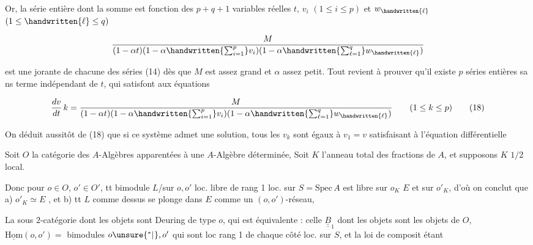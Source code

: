 Or, la série entière dont la somme est fonction des $p+q+1$ variables réelles $t$, $v_i$ $(1\leq i\leq p)$ et $w_{\handwritten{\ell}}$ $(1\leq\handwritten{\ell}\leq q)$

\[
\frac{M}{(1-\alpha t)(1-\alpha\handwritten{\sum_{i=1}^{p}}v_i)(1-\alpha\handwritten{\sum_{\ell=1}^{q}}w_{\handwritten{\ell}})}
\]

est une jorante de chacune des séries (14) dès que $M$ est assez grand et $\alpha$ assez petit. Tout revient à prouver qu'il existe $p$ séries entières sa ns terme indépendant de $t$, qui satisfont aux équations

\[
\frac{dv}{dt}\,k=\frac{M}{(1-\alpha t)(1-\alpha\handwritten{\sum_{i=1}^{p}}v_i)(1-\alpha\handwritten{\sum_{\ell=1}^{q}}w_{\handwritten{\ell}})}
\qquad(1\leq k\leq p)\tag*{(18)}
\]

On déduit aussitôt de (18) que si ce système admet une solution, tous les $v_k$ sont égaux à $v_1=v$ satisfaisant à l'équation différentielle

Soit  $O$ la catégorie des $A$-Algèbres apparentées  à une $A$-Algèbre déterminée,  Soit $K$ l'anneau total des fractions de $A$,  et supposons $K$ $1/2$ local.

Donc  pour $o\in O$, $o'\in O'$, tt bimodule $L$/sur $o,o'$ loc. libre de rang 1  loc. sur $S=\mathrm{Spec}\,A$ est libre  sur $o_K$ \deleted{\unsure{$=$|$\simeq$}} $E$ et sur $o'_K$, d'où on conclut que
a) $o'_K\simeq E$  , et b)  tt $L$ comme dessus se plonge  dans $E$  comme un $(o,o')$-réseau,

La sous $2$-catégorie  dont les objets sont   Deuring de type $o$,  qui est équivalente : celle $\underline{\underline B}_1$ dont les objets sont les objets de $O$, $\underline{\mathrm{Hom}}(o,o')=$  bimodules  $o\unsure{^{*}|^{}},o'$ qui sont loc   rang 1 de chaque côté loc. sur $S$, et la loi de composit étant

